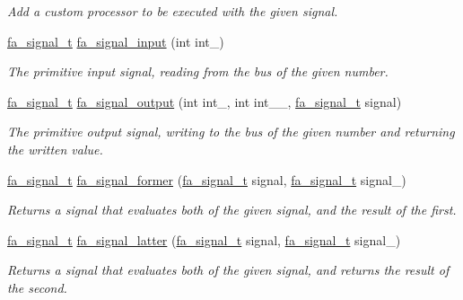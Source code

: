 \begin{DoxyCompactItemize}
\begin{DoxyCompactList}\small\item\em Add a custom processor to be executed with the given signal. \end{DoxyCompactList}\item 
\hyperlink{group___fa_signal_gac5c72f160cd6e93a6783551627b166e5}{fa\-\_\-signal\-\_\-t} \hyperlink{group___fa_signal_gafd39f63693a025305682c02bd84a279b}{fa\-\_\-signal\-\_\-input} (int int\-\_\-)
\begin{DoxyCompactList}\small\item\em The primitive input signal, reading from the bus of the given number. \end{DoxyCompactList}\item 
\hyperlink{group___fa_signal_gac5c72f160cd6e93a6783551627b166e5}{fa\-\_\-signal\-\_\-t} \hyperlink{group___fa_signal_ga48817a0a198589535a59b8f39fa6cff0}{fa\-\_\-signal\-\_\-output} (int int\-\_\-, int int\-\_\-\-\_\-, \hyperlink{group___fa_signal_gac5c72f160cd6e93a6783551627b166e5}{fa\-\_\-signal\-\_\-t} signal)
\begin{DoxyCompactList}\small\item\em The primitive output signal, writing to the bus of the given number and returning the written value. \end{DoxyCompactList}\item 
\hyperlink{group___fa_signal_gac5c72f160cd6e93a6783551627b166e5}{fa\-\_\-signal\-\_\-t} \hyperlink{group___fa_signal_gadf564a32b3dc1cd0e9c583f01fecb6de}{fa\-\_\-signal\-\_\-former} (\hyperlink{group___fa_signal_gac5c72f160cd6e93a6783551627b166e5}{fa\-\_\-signal\-\_\-t} signal, \hyperlink{group___fa_signal_gac5c72f160cd6e93a6783551627b166e5}{fa\-\_\-signal\-\_\-t} signal\-\_\-)
\begin{DoxyCompactList}\small\item\em Returns a signal that evaluates both of the given signal, and the result of the first. \end{DoxyCompactList}\item 
\hyperlink{group___fa_signal_gac5c72f160cd6e93a6783551627b166e5}{fa\-\_\-signal\-\_\-t} \hyperlink{group___fa_signal_ga1b6422ac65878a4fbc35f7be9858b9b5}{fa\-\_\-signal\-\_\-latter} (\hyperlink{group___fa_signal_gac5c72f160cd6e93a6783551627b166e5}{fa\-\_\-signal\-\_\-t} signal, \hyperlink{group___fa_signal_gac5c72f160cd6e93a6783551627b166e5}{fa\-\_\-signal\-\_\-t} signal\-\_\-)
\begin{DoxyCompactList}\small\item\em Returns a signal that evaluates both of the given signal, and returns the result of the second. \end{DoxyCompactList}\item 

\end{DoxyCompactItemize}
